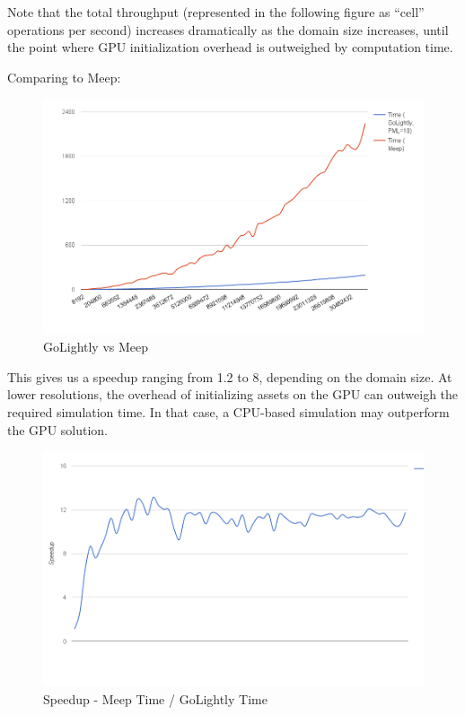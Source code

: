 Note that the total throughput (represented in the following figure as “cell” operations per second) increases dramatically as the domain size increases, until the point where GPU initialization overhead is outweighed by computation time.

Comparing to Meep:

\begin{figure}[H]
	\centering
	\includegraphics[width=\textwidth,
	keepaspectratio]{gpu-vs-meep.png}
	\caption{GoLightly vs Meep}
	\label{fig:gpuVsMeep}
\end{figure}

This gives us a speedup ranging from 1.2 to 8, depending on the domain size. At lower resolutions, the overhead of initializing assets on the GPU can outweigh the required simulation time. In that case, a CPU-based simulation may outperform the GPU solution.

\begin{figure}[H]
	\centering
	\includegraphics[width=\textwidth,
	keepaspectratio]{gpu-vs-meep-speedup.png}
	\caption{Speedup - Meep Time / GoLightly Time}
	\label{fig:gpuVsMeepSpeedup}
\end{figure}


